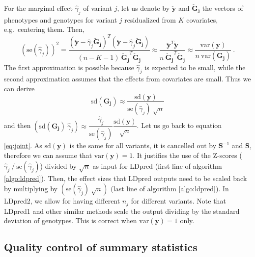 \documentclass{bioinfo}
\begin{document}
\begin{methods}
For the marginal effect $\hat{\gamma}_j$ of variant $j$, let us denote by $\boldsymbol{\breve{y}}$ and $\boldsymbol{\breve{G}_j}$ the vectors of phenotypes and genotypes for variant $j$ residualized from $K$ covariates, e.g.\ centering them.
Then,
\[\left(\text{se}(\hat{\gamma}_j)\right)^2 = \dfrac{(\boldsymbol{\breve{y}} - \hat{\gamma}_j \boldsymbol{\breve{G}_j})^T (\boldsymbol{\breve{y}} - \hat{\gamma}_j \boldsymbol{\breve{G}_j})}{(n - K - 1) ~ \boldsymbol{\breve{G}_j}^T \boldsymbol{\breve{G}_j}} \approx \dfrac{\boldsymbol{\breve{y}}^T \boldsymbol{\breve{y}}}{n ~ \boldsymbol{\breve{G}_j}^T \boldsymbol{\breve{G}_j}} \approx \dfrac{\text{var}(\boldsymbol{y})}{n ~ \text{var}(\boldsymbol{G_j})} ~.\]
The first approximation is possible because $\hat{\gamma}_j$ is expected to be small, while the second approximation assumes that the effects from covariates are small. 
Thus we can derive 
\begin{equation}\label{eq:approx-sd-lin}
\text{sd}(\boldsymbol{G_j}) \approx \dfrac{\text{sd}(\boldsymbol{y})}{\text{se}(\hat{\gamma}_j) ~ \sqrt{n}}
\end{equation}
and then $\left(\text{sd}(\boldsymbol{G_j}) ~ \hat{\gamma}_j\right) \approx \dfrac{\hat{\gamma}_j}{\text{se}(\hat{\gamma}_j)} \dfrac{\text{sd}(\boldsymbol{y})}{\sqrt{n}}$.
Let us go back to equation \ref{eq:joint}. 
As $\text{sd}(\boldsymbol{y})$ is the same for all variants, it is cancelled out by $\boldsymbol{S}^{-1}$ and $\boldsymbol{S}$, therefore we can assume that $\text{var}(\boldsymbol{y}) = 1$. 
It justifies the use of the Z-scores ($\hat{\gamma}_j ~/~ \text{se}(\hat{\gamma}_j)$) divided by $\sqrt{n}$ as input for LDpred (first line of algorithm \ref{algo:ldpred}). Then, the effect sizes that LDpred outputs need to be scaled back by multiplying by $\left(\text{se}(\hat{\gamma}_j) ~ \sqrt{n}\right)$ (last line of algorithm \ref{algo:ldpred}).
In LDpred2, we allow for having different $n_j$ for different variants. 
Note that LDpred1 and other similar methods scale the output dividing by the standard deviation of genotypes. This is correct when $\text{var}(\boldsymbol{y}) = 1$ only.


\subsection*{Quality control of summary statistics}


\end{methods}
\end{document}
